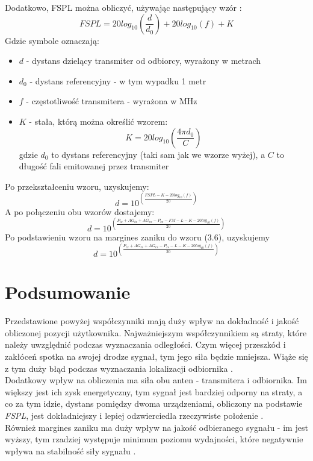 Dodatkowo, FSPL można obliczyć, używając następujący wzór \cite{EN}:
\begin{equation}
FSPL = 20log_{10}\left(\frac{d}{d_{0}}\right) + 20log_{10}(f) + K
\end{equation}
Gdzie symbole oznaczają:
\begin{itemize}
	\item $d$ - dystans dzielący transmiter od odbiorcy, wyrażony w metrach
	\item $d_{0}$ - dystans referencyjny -  w tym wypadku 1 metr
	\item $f$ - częstotliwość transmitera - wyrażona w MHz
	\item $K$ - stała, którą można określić wzorem:
	\begin{equation}
	K = 20log_{10}\left(\frac{4\pi d_{0}}{C}\right)
	\end{equation}
	gdzie $d_{0}$ to dystans referencyjny (taki sam jak we wzorze wyżej), a $C$ to długość fali emitowanej przez transmiter
\end{itemize}	  
Po przekształceniu wzoru, uzyskujemy:
\begin{equation}
d = 10^{\left(\frac{FSPL - K - 20log_{10}(f)}{20}\right)}
\end{equation}
A po połączeniu obu wzorów dostajemy:
\begin{equation}
d = 10^{\left(\frac{P_{tx} + AG_{tx} + AG_{rx} - P_{rx} - FM - L - K - 20log_{10}(f)}{20}\right)}
\end{equation}
Po podstawieniu wzoru na margines zaniku do wzoru (3.6), uzyskujemy
\begin{equation}
d = 10^{\left(\frac{P_{tx} + AG_{tx} + AG_{rx} - P_{rs} - L - K - 20log_{10}(f)}{20}\right)}
\end{equation}
\section{Podsumowanie}
Przedstawione powyżej współczynniki mają duży wpływ na dokładność i jakość obliczonej pozycji użytkownika. Najważniejszym współczynnikiem są straty, które należy uwzględnić podczas wyznaczania odległości. Czym więcej przeszkód i zakłóceń spotka na swojej drodze sygnał, tym jego siła będzie mniejsza. Wiąże się z tym duży błąd podczas wyznaczania lokalizacji odbiornika \cite{RSC}.\\
Dodatkowy wpływ na obliczenia ma siła obu anten - transmitera i odbiornika. Im większy jest ich zysk energetyczny, tym sygnał jest bardziej odporny na straty, a co za tym idzie, dystans pomiędzy dwoma urządzeniami, obliczony na podstawie \textit{FSPL}, jest dokładniejszy i lepiej odzwierciedla rzeczywiste położenie \cite{FSPL}.\\
Również margines zaniku ma duży wpływ na jakość odbieranego sygnału - im jest wyższy, tym rzadziej występuje minimum poziomu wydajności, które negatywnie wpływa na stabilność siły sygnału \cite{MT}.
